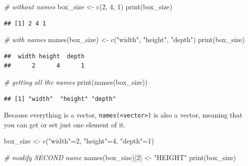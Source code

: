 \documentclass[
]{book}
\newenvironment{Shaded}{\begin{snugshade}}{\end{snugshade}}
\newcommand{\CommentTok}[1]{\textcolor[rgb]{0.56,0.35,0.01}{\textit{#1}}}
\newcommand{\DecValTok}[1]{\textcolor[rgb]{0.00,0.00,0.81}{#1}}
\newcommand{\FunctionTok}[1]{\textcolor[rgb]{0.00,0.00,0.00}{#1}}
\newcommand{\NormalTok}[1]{#1}
\newcommand{\OtherTok}[1]{\textcolor[rgb]{0.56,0.35,0.01}{#1}}
\newcommand{\StringTok}[1]{\textcolor[rgb]{0.31,0.60,0.02}{#1}}
\begin{document}
\begin{Shaded}
\begin{Highlighting}[]
\CommentTok{\# without names}
\NormalTok{box\_size }\OtherTok{\textless{}{-}} \FunctionTok{c}\NormalTok{(}\DecValTok{2}\NormalTok{, }\DecValTok{4}\NormalTok{, }\DecValTok{1}\NormalTok{) }
\FunctionTok{print}\NormalTok{(box\_size)}
\end{Highlighting}
\end{Shaded}

\begin{verbatim}
## [1] 2 4 1
\end{verbatim}

\begin{Shaded}
\begin{Highlighting}[]
\CommentTok{\# with names}
\FunctionTok{names}\NormalTok{(box\_size) }\OtherTok{\textless{}{-}} \FunctionTok{c}\NormalTok{(}\StringTok{"width"}\NormalTok{, }\StringTok{"height"}\NormalTok{, }\StringTok{"depth"}\NormalTok{)}
\FunctionTok{print}\NormalTok{(box\_size)}
\end{Highlighting}
\end{Shaded}

\begin{verbatim}
##  width height  depth 
##      2      4      1
\end{verbatim}

\begin{Shaded}
\begin{Highlighting}[]
\CommentTok{\# getting all the names}
\FunctionTok{print}\NormalTok{(}\FunctionTok{names}\NormalTok{(box\_size))}
\end{Highlighting}
\end{Shaded}

\begin{verbatim}
## [1] "width"  "height" "depth"
\end{verbatim}

Because everything is a vector, \texttt{names(\textless{}vector\textgreater{})} is also a vector, meaning that you can get or set just one element of it.

\begin{Shaded}
\begin{Highlighting}[]
\NormalTok{box\_size }\OtherTok{\textless{}{-}} \FunctionTok{c}\NormalTok{(}\StringTok{"width"}\OtherTok{=}\DecValTok{2}\NormalTok{, }\StringTok{"height"}\OtherTok{=}\DecValTok{4}\NormalTok{, }\StringTok{"depth"}\OtherTok{=}\DecValTok{1}\NormalTok{) }

\CommentTok{\# modify SECOND name}
\FunctionTok{names}\NormalTok{(box\_size)[}\DecValTok{2}\NormalTok{] }\OtherTok{\textless{}{-}} \StringTok{"HEIGHT"}
\FunctionTok{print}\NormalTok{(box\_size)}
\end{Highlighting}
\end{Shaded}
\end{document}
